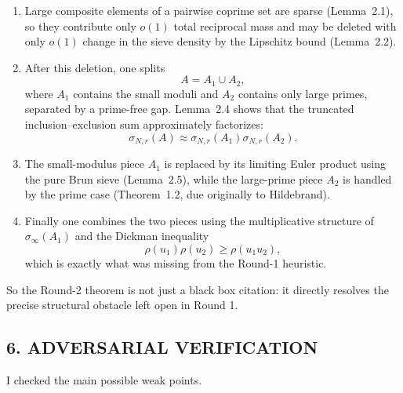 \begin{enumerate}
\item Large composite elements of a pairwise coprime set are sparse (Lemma~2.1), so they contribute only $o(1)$ total reciprocal mass and may be deleted with only $o(1)$ change in the sieve density by the Lipschitz bound (Lemma~2.2).
\item After this deletion, one splits
\[
A=A_1\cup A_2,
\]
where $A_1$ contains the small moduli and $A_2$ contains only large primes, separated by a prime-free gap. Lemma~2.4 shows that the truncated inclusion--exclusion sum approximately factorizes:
\[
\sigma_{N,r}(A)\approx \sigma_{N,r}(A_1)\sigma_{N,r}(A_2).
\]
\item The small-modulus piece $A_1$ is replaced by its limiting Euler product using the pure Brun sieve (Lemma~2.5), while the large-prime piece $A_2$ is handled by the prime case (Theorem~1.2, due originally to Hildebrand).
\item Finally one combines the two pieces using the multiplicative structure of $\sigma_\infty(A_1)$ and the Dickman inequality
\[
\rho(u_1)\rho(u_2)\geq \rho(u_1u_2),
\]
which is exactly what was missing from the Round-1 heuristic.
\end{enumerate}

So the Round-2 theorem is not just a black box citation: it directly resolves the precise structural obstacle left open in Round 1.

\subsection*{6. ADVERSARIAL VERIFICATION}

I checked the main possible weak points.

